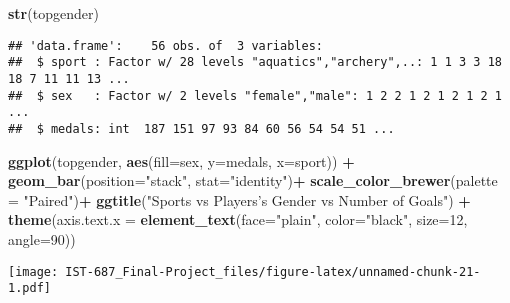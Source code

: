 \documentclass[]{article}
\newenvironment{Shaded}{\begin{snugshade}}{\end{snugshade}}
\newcommand{\DataTypeTok}[1]{\textcolor[rgb]{0.13,0.29,0.53}{#1}}
\newcommand{\DecValTok}[1]{\textcolor[rgb]{0.00,0.00,0.81}{#1}}
\newcommand{\KeywordTok}[1]{\textcolor[rgb]{0.13,0.29,0.53}{\textbf{#1}}}
\newcommand{\NormalTok}[1]{#1}
\newcommand{\OperatorTok}[1]{\textcolor[rgb]{0.81,0.36,0.00}{\textbf{#1}}}
\newcommand{\StringTok}[1]{\textcolor[rgb]{0.31,0.60,0.02}{#1}}
\begin{document}
\begin{Shaded}
\begin{Highlighting}[]
\KeywordTok{str}\NormalTok{(topgender)}
\end{Highlighting}
\end{Shaded}

\begin{verbatim}
## 'data.frame':    56 obs. of  3 variables:
##  $ sport : Factor w/ 28 levels "aquatics","archery",..: 1 1 3 3 18 18 7 11 11 13 ...
##  $ sex   : Factor w/ 2 levels "female","male": 1 2 2 1 2 1 2 1 2 1 ...
##  $ medals: int  187 151 97 93 84 60 56 54 54 51 ...
\end{verbatim}

\begin{Shaded}
\begin{Highlighting}[]
\KeywordTok{ggplot}\NormalTok{(topgender, }\KeywordTok{aes}\NormalTok{(}\DataTypeTok{fill=}\NormalTok{sex, }\DataTypeTok{y=}\NormalTok{medals, }\DataTypeTok{x=}\NormalTok{sport)) }\OperatorTok{+}\StringTok{ }\KeywordTok{geom_bar}\NormalTok{(}\DataTypeTok{position=}\StringTok{"stack"}\NormalTok{, }\DataTypeTok{stat=}\StringTok{"identity"}\NormalTok{)}\OperatorTok{+}
\StringTok{    }\KeywordTok{scale_color_brewer}\NormalTok{(}\DataTypeTok{palette =} \StringTok{"Paired"}\NormalTok{)}\OperatorTok{+}
\StringTok{    }\KeywordTok{ggtitle}\NormalTok{(}\StringTok{"Sports vs Players's Gender vs Number of Goals"}\NormalTok{) }\OperatorTok{+}
\StringTok{    }\KeywordTok{theme}\NormalTok{(}\DataTypeTok{axis.text.x =} \KeywordTok{element_text}\NormalTok{(}\DataTypeTok{face=}\StringTok{"plain"}\NormalTok{, }\DataTypeTok{color=}\StringTok{"black"}\NormalTok{, }\DataTypeTok{size=}\DecValTok{12}\NormalTok{, }\DataTypeTok{angle=}\DecValTok{90}\NormalTok{))}
\end{Highlighting}
\end{Shaded}

\texttt{[image: IST-687\_Final-Project\_files/figure-latex/unnamed-chunk-21-1.pdf]}
\end{document}
